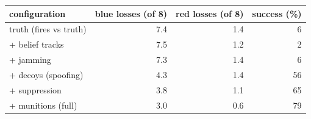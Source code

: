 \begin{tabular}{lrrr}
\toprule
configuration & blue losses (of 8) & red losses (of 8) & success (\%) \\
\midrule
truth (fires vs truth) & 7.4 & 1.4 & 6 \\
+ belief tracks & 7.5 & 1.2 & 2 \\
+ jamming & 7.3 & 1.4 & 6 \\
+ decoys (spoofing) & 4.3 & 1.4 & 56 \\
+ suppression & 3.8 & 1.1 & 65 \\
+ munitions (full) & 3.0 & 0.6 & 79 \\
\bottomrule
\end{tabular}
